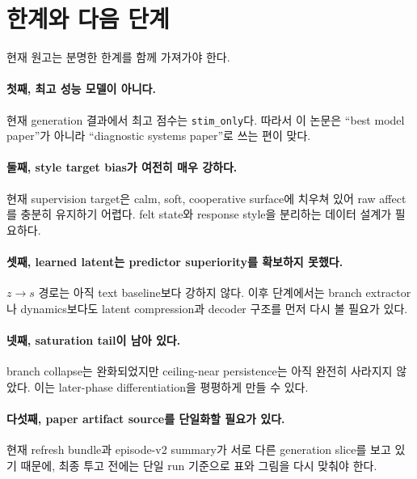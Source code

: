 \section{한계와 다음 단계}

현재 \EmoNet{} 원고는 분명한 한계를 함께 가져가야 한다.

\paragraph{첫째, 최고 성능 모델이 아니다.}
현재 generation 결과에서 최고 점수는 \texttt{stim\_only}다. 따라서 이 논문은 ``best model paper''가 아니라 ``diagnostic systems paper''로 쓰는 편이 맞다.

\paragraph{둘째, style target bias가 여전히 매우 강하다.}
현재 supervision target은 calm, soft, cooperative surface에 치우쳐 있어 raw affect를 충분히 유지하기 어렵다. felt state와 response style을 분리하는 데이터 설계가 필요하다.

\paragraph{셋째, learned latent는 predictor superiority를 확보하지 못했다.}
$z \rightarrow s$ 경로는 아직 text baseline보다 강하지 않다. 이후 단계에서는 branch extractor나 dynamics보다도 latent compression과 decoder 구조를 먼저 다시 볼 필요가 있다.

\paragraph{넷째, saturation tail이 남아 있다.}
branch collapse는 완화되었지만 ceiling-near persistence는 아직 완전히 사라지지 않았다. 이는 later-phase differentiation을 평평하게 만들 수 있다.

\paragraph{다섯째, paper artifact source를 단일화할 필요가 있다.}
현재 refresh bundle과 episode-v2 summary가 서로 다른 generation slice를 보고 있기 때문에, 최종 투고 전에는 단일 run 기준으로 표와 그림을 다시 맞춰야 한다.
